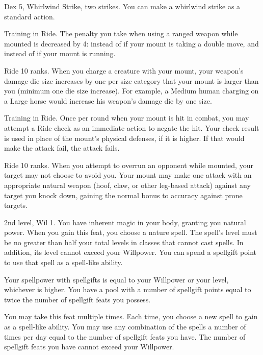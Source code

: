 \featpres Dex 5, Whirlwind Strike, two strikes.
\featben You can make a whirlwind strike as a standard action.

\featpre Training in Ride.
\featben The penalty you take when using a ranged weapon while mounted is decreased by 4:  instead of  if your mount is taking a double move, and  instead of  if your mount is running.

\featpre Ride 10 ranks.
\featben When you charge a creature with your mount, your weapon's damage die size increases by one per size category that your mount is larger than you (minimum one die size increase).
For example, a Medium human charging on a Large horse would increase his weapon's damage die by one size.

\featpre Training in Ride.
\featben Once per round when your mount is hit in combat, you may attempt a Ride check as an immediate action to negate the hit.
Your check result is used in place of the mount's physical defenses, if it is higher.
If that would make the attack fail, the attack fails.

\featpre Ride 10 ranks.
\featben When you attempt to overrun an opponent while mounted, your target may not choose to avoid you.
Your mount may make one attack with an appropriate natural weapon (hoof, claw, or other leg-based attack) against any target you knock down, gaining the normal  bonus to accuracy against prone targets.

\featpres 2nd level, Wil 1.
\featben You have inherent magic in your body, granting you natural power.
When you gain this feat, you choose a nature spell.
The spell's level must be no greater than half your total levels in classes that cannot cast spells.
In addition, its level cannot exceed your Willpower.
You can spend a spellgift point to use that spell as a spell-like ability.

Your spellpower with spellgifts is equal to your Willpower or your level, whichever is higher.
You have a pool with a number of spellgift points equal to twice the number of spellgift feats you possess.

You may take this feat multiple times.
Each time, you choose a new spell to gain as a spell-like ability.
You may use any combination of the spells a number of times per day equal to the number of spellgift feats you have.
The number of spellgift feats you have cannot exceed your Willpower.

